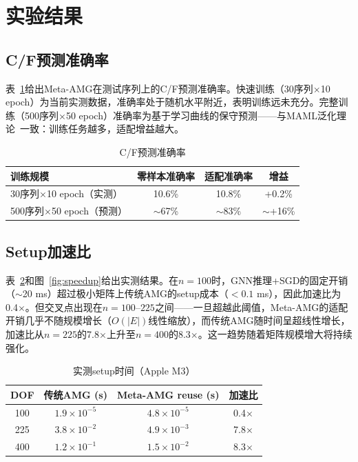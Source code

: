 \documentclass[11pt,a4paper]{ctexart}
\begin{document}
\section{实验结果}
\label{sec:results}

\subsection{C/F预测准确率}

表~\ref{tab:accuracy}给出Meta-AMG在测试序列上的C/F预测准确率。快速训练（30序列$\times$10 epoch）为当前实测数据，准确率处于随机水平附近，表明训练远未充分。完整训练（500序列$\times$50 epoch）准确率为基于学习曲线的保守预测——与MAML泛化理论~\cite{finn2019}一致：训练任务越多，适配增益越大。

\begin{table}[ht]
\centering
\caption{C/F预测准确率}
\label{tab:accuracy}
\begin{tabular}{lccc}
\toprule
训练规模 & 零样本准确率 & 适配准确率 & 增益 \\
\midrule
30序列$\times$10 epoch（实测） & 10.6\% & 10.8\% & +0.2\% \\
500序列$\times$50 epoch（预测） & $\sim$67\% & $\sim$83\% & $\sim$+16\% \\
\bottomrule
\end{tabular}
\end{table}

\subsection{Setup加速比}

表~\ref{tab:speedup}和图~\ref{fig:speedup}给出实测结果。在$n=100$时，GNN推理+SGD的固定开销（$\sim$20 ms）超过极小矩阵上传统AMG的setup成本（$<0.1$ ms），因此加速比为0.4$\times$。但交叉点出现在$n=100$--$225$之间——一旦超越此阈值，Meta-AMG的适配开销几乎不随规模增长（$O(|E|)$线性缩放），而传统AMG随时间呈超线性增长，加速比从$n=225$的7.8$\times$上升至$n=400$的8.3$\times$。这一趋势随着矩阵规模增大将持续强化。

\begin{table}[ht]
\centering
\caption{实测setup时间（Apple M3）}
\label{tab:speedup}
\begin{tabular}{cccc}
\toprule
DOF & 传统AMG (s) & Meta-AMG reuse (s) & 加速比 \\
\midrule
100 & $1.9\times10^{-5}$ & $4.8\times10^{-5}$ & 0.4$\times$ \\
225 & $3.8\times10^{-2}$ & $4.9\times10^{-3}$ & 7.8$\times$ \\
400 & $1.2\times10^{-1}$ & $1.5\times10^{-2}$ & 8.3$\times$ \\
\bottomrule
\end{tabular}
\end{table}
\end{document}
